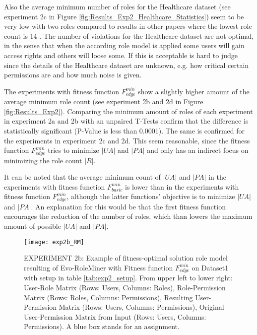 Also the average minimum number of roles for the Healthcare dataset (see experiment 2c in Figure \ref{fig:Results_Exp2_Healthcare_Statistics}) seem to be very low with two roles compared to results in other papers where the lowest role count is 14 \cite{Ene}\cite{Molloy:2009:ERM:1542207.1542224}. The number of violations for the Healthcare dataset are not optimal, in the sense that when the according role model is applied some users will gain access rights and others will loose some. If this is acceptable is hard to judge since the details of the Healthcare dataset are unknown, e.g. how critical certain permissions are and how much noise is given.

The experiments with fitness function $F_{edge}^{min}$ show a slightly higher amount of the average minimum role count (see experiment 2b and 2d in Figure \ref{fig:Results_Exp2}). Comparing the minimum amount of roles of each experiment in experiment 2a and 2b with an unpaired T-Tests confirm that the difference is statistically significant (P-Value is less than 0.0001). The same is confirmed for the experiments in experiment 2c and 2d. This seem reasonable, since the fitness function $F_{edge}^{min}$ tries to minimize $|UA|$ and $|PA|$ and only has an indirect focus on minimizing the role count $|R|$.

It can be noted that the average minimum count of $|UA|$ and $|PA|$ in the experiments with fitness function $F_{basic}^{min}$ is lower than in the experiments with fitness function $F_{edge}^{min}$, although the latter functions' objective is to minimize $|UA|$ and $|PA|$. An explanation for this would be that the first fitness function encourages the reduction of the number of roles, which than lowers the maximum amount of possible $|UA|$ and $|PA|$.

\begin{figure}[H]
	\centering
	\texttt{[image: exp2b\_RM]}
	\caption{EXPERIMENT 2b: Example of fitness-optimal solution role model resulting of Evo-RoleMiner with Fitness function $F_{edge}^{min}$ on Dataset1 with setup in table \ref{tab:exp2_setup}. From upper left to lower right: User-Role Matrix (Rows: Users, Columns: Roles), Role-Permission Matrix (Rows: Roles, Columns: Permissions), Resulting User-Permission Matrix (Rows: Users, Columns: Permissions), Original User-Permission Matrix from Input (Rows: Users, Columns: Permissions). A blue box stands for an assignment.}
	\label{fig:exp2b_RM}
\end{figure}

